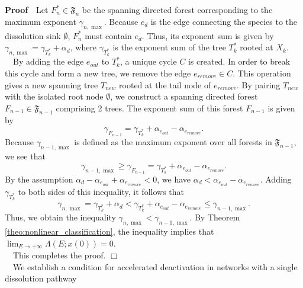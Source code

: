 \documentclass[11pt,a4paper]{article}
\begin{document}
\noindent
{\bf Proof}~~Let $F_n^* \in \mathfrak{F}_n$ be the spanning directed forest corresponding to the maximum exponent $\gamma_{n, \max}$. Because $e_d$ is the edge connecting the species to the dissolution sink $\emptyset$, $F_n^*$ must contain $e_d$. Thus, its exponent sum is given by $\gamma_{n, \max} = \gamma_{T_k^*} + \alpha_d$, where $\gamma_{T_k^*}$ is the exponent sum of the tree $T_k^*$ rooted at $X_k$.\\
\noindent
~~By adding the edge $e_{out}$ to $T_k^*$, a unique cycle $C$ is created. In order to break this cycle and form a new tree, we remove the edge $e_{remove} \in C$. This operation gives a new spanning tree $T_{new}$ rooted at the tail node of $e_{remove}$. By pairing $T_{new}$ with the isolated root node $\emptyset$, we construct a spanning directed forest $F_{n-1} \in \mathfrak{F}_{n-1}$ comprising 2 trees. The exponent sum of this forest $F_{n-1}$ is given by
\begin{equation}
\gamma_{F_{n-1}} = \gamma_{T_k^*} + \alpha_{e_{out}} - \alpha_{e_{remove}}.
\end{equation}
Because $\gamma_{n-1, \max}$ is defined as the maximum exponent over all forests in $\mathfrak{F}_{n-1}$, we see that
\begin{equation}
\gamma_{n-1, \max} \ge \gamma_{F_{n-1}} = \gamma_{T_k^*} + \alpha_{e_{out}} - \alpha_{e_{remove}}.
\end{equation}
By the assumption $\alpha_d - \alpha_{e_{out}} + \alpha_{e_{remove}} < 0$, we have $\alpha_d < \alpha_{e_{out}} - \alpha_{e_{remove}}$. Adding $\gamma_{T_k^*}$ to both sides of this inequality, it follows that
\begin{equation}
\gamma_{n, \max} = \gamma_{T_k^*} + \alpha_d < \gamma_{T_k^*} + \alpha_{e_{out}} - \alpha_{e_{remove}} \le \gamma_{n-1, \max}.
\end{equation}
Thus, we obtain the inequality $\gamma_{n, \max} < \gamma_{n-1, \max}$. By Theorem \ref{theo:nonlinear_classification}, the inequality implies that $\lim_{E \to +\infty}\Lambda(E;x(0)) = 0$.\\
~~This completes the proof. \hfill $\Box$\\[0.2cm]
~~We establish a condition for accelerated deactivation in networks with a single dissolution pathway
\end{document}
